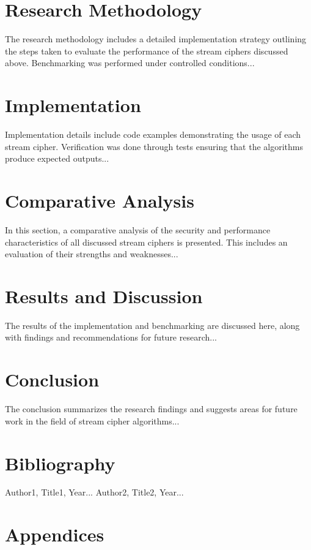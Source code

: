 \chapter{Research Methodology}
The research methodology includes a detailed implementation strategy outlining the steps taken to evaluate the performance of the stream ciphers discussed above. Benchmarking was performed under controlled conditions...

\chapter{Implementation}
Implementation details include code examples demonstrating the usage of each stream cipher. Verification was done through tests ensuring that the algorithms produce expected outputs...

\chapter{Comparative Analysis}
In this section, a comparative analysis of the security and performance characteristics of all discussed stream ciphers is presented. This includes an evaluation of their strengths and weaknesses...

\chapter{Results and Discussion}
The results of the implementation and benchmarking are discussed here, along with findings and recommendations for future research...

\chapter{Conclusion}
The conclusion summarizes the research findings and suggests areas for future work in the field of stream cipher algorithms...

\chapter{Bibliography}
\begin{thebibliography}{99}
 Author1, Title1, Year...
 Author2, Title2, Year...
\end{thebibliography}

\chapter{Appendices}
